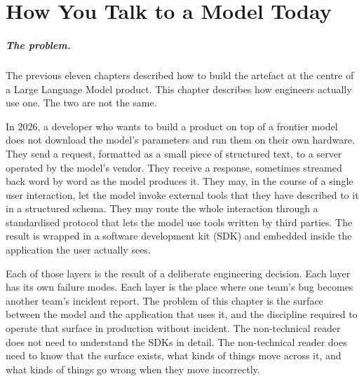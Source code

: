 
\chapter{How You Talk to a Model Today}
\label{chap:agents}
\label{ntg:ch12}

\scenelabel
\begin{scenestrip}
\end{scenestrip}

\paragraph{The problem.} The previous eleven chapters described how to build the
artefact at the centre of a Large Language Model product. This
chapter describes how engineers actually use one. The two are
not the same.

In 2026, a developer who wants to build a product on top of a
frontier model does not download the model's parameters and
run them on their own hardware. They send a request, formatted
as a small piece of structured text, to a server operated by
the model's vendor. They receive a response, sometimes streamed
back word by word as the model produces it. They may, in the
course of a single user interaction, let the model invoke
external tools that they have described to it in a structured
schema. They may route the whole interaction through a
standardised protocol that lets the model use tools written by
third parties. The result is wrapped in a software development
kit (SDK) and embedded inside the application the user actually
sees.

Each of those layers is the result of a deliberate engineering
decision. Each layer has its own failure modes. Each layer is
the place where one team's bug becomes another team's incident
report. The problem of this chapter is the surface between the
model and the application that uses it, and the discipline
required to operate that surface in production without
incident. The non-technical reader does not need to understand
the SDKs in detail. The non-technical reader does need to know
that the surface exists, what kinds of things move across it,
and what kinds of things go wrong when they move incorrectly.

